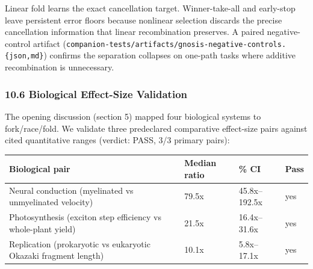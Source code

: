 \documentclass[
  11pt,
]{article}
\newcounter{none} %
\begin{document}
Linear fold learns the exact cancellation target. Winner-take-all and
early-stop leave persistent error floors because nonlinear selection
discards the precise cancellation information that linear recombination
preserves. A paired negative-control artifact
(\texttt{companion-\allowbreak{}tests/\allowbreak{}artifacts/\allowbreak{}gnosis-\allowbreak{}negative-\allowbreak{}controls.\allowbreak{}\{json,md\}})
confirms the separation collapses on one-path tasks where additive
recombination is unnecessary.

\subsubsection{10.6 Biological Effect-Size
Validation}\label{biological-effect-size-validation}

The opening discussion (section 5) mapped four biological systems to
fork/race/fold. We validate three predeclared comparative effect-size
pairs against cited quantitative ranges (verdict: PASS, 3/3 primary
pairs):

{\def\LTcaptype{none} %
\begin{longtable}[]{@{}
  >{\raggedright\arraybackslash}p{}
  >{\raggedleft\arraybackslash}p{}
  >{\raggedleft\arraybackslash}p{}
  >{\raggedright\arraybackslash}p{}@{}}
\toprule\noalign{}
\begin{minipage}[b]{\linewidth}\raggedright
Biological pair
\end{minipage} & \begin{minipage}[b]{\linewidth}\raggedleft
Median ratio
\end{minipage} & \begin{minipage}[b]{\linewidth}\raggedleft
95\% CI
\end{minipage} & \begin{minipage}[b]{\linewidth}\raggedright
Pass
\end{minipage} \\
\midrule\noalign{}
\endhead
\bottomrule\noalign{}
\endlastfoot
Neural conduction (myelinated vs unmyelinated velocity) & 79.5x &
45.8x--192.5x & yes \\
Photosynthesis (exciton step efficiency vs whole-plant yield) & 21.5x &
16.4x--31.6x & yes \\
Replication (prokaryotic vs eukaryotic Okazaki fragment length) & 10.1x
& 5.8x--17.1x & yes \\
\end{longtable}
}
\end{document}
